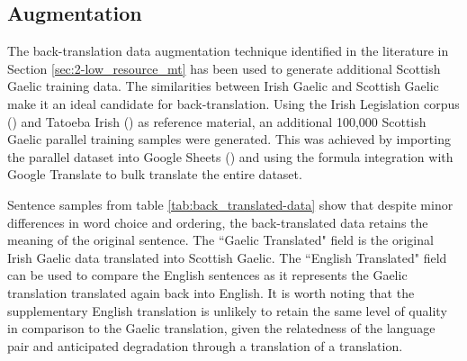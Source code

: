 \subsection{Augmentation}

The back-translation data augmentation technique identified in the literature in Section \ref{sec:2-low_resource_mt} has been used to generate additional Scottish Gaelic training data. The similarities between Irish Gaelic and Scottish Gaelic make it an ideal candidate for back-translation. Using the Irish Legislation corpus (\cite{irish_corpus_2017}) and Tatoeba Irish (\cite{tiedemann_opus_2012}) as reference material, an additional 100,000 Scottish Gaelic parallel training samples were generated. This was achieved by importing the parallel dataset into Google Sheets (\cite{google_sheets_2020}) and using the formula integration with Google Translate to bulk translate the entire dataset.


Sentence samples from table \ref{tab:back_translated-data} show that despite minor differences in word choice and ordering, the back-translated data retains the meaning of the original sentence. The ``Gaelic Translated" field is the original Irish Gaelic data translated into Scottish Gaelic. The ``English Translated" field can be used to compare the English sentences as it represents the Gaelic translation translated again back into English. It is worth noting that the supplementary English translation is unlikely to retain the same level of quality in comparison to the Gaelic translation, given the relatedness of the language pair and anticipated degradation through a translation of a translation.

